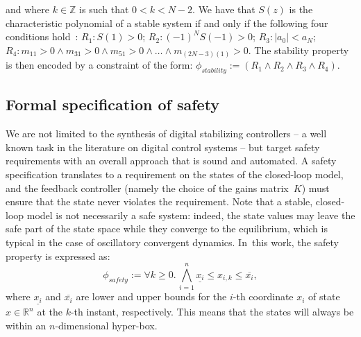 \documentclass[twocolumn]{autart}    %
\newcommand{\addtodo}[1]{\textcolor{red}{[#1]}}
\begin{document}
%
and where $k \in \mathbb{Z}$ is such that $0 < k < N - 2$. 
We have that $S(z)$ is the characteristic polynomial of a stable system if and only if the following four conditions hold~\cite{astrom1997computer}:
$R_1: S(1) > 0$;
$R_2: (−1)^N S(−1) > 0$;
$R_3: |a_0| < a_N$;
$R_4: m_{11} > 0 \wedge\allowbreak
      m_{31}>0 \wedge\allowbreak
      m_{51}>0 \wedge \ldots \wedge\allowbreak
      m_{(2N{-}3)(1)}>0$.
%
The stability property is then encoded by a constraint of the form:
$
\phi_\mathit{stability} := (R_1 \wedge R_2 \wedge R_3 \wedge R_4).
$


\subsection{Formal specification of safety} 
\label{ssec:safespecification}

We are not limited to the synthesis of digital stabilizing controllers -- a
well known task in the literature on digital control systems -- but target
safety requirements with an overall approach that is sound and automated. 
A safety specification translates to a requirement on the states of the closed-loop model, 
and the feedback controller (namely the choice of the gains matrix~$K$) 
must ensure that the state never violates the requirement.  
Note that a stable, closed-loop model is not necessarily a safe system: 
indeed, the state values may leave the safe part of the state space while they converge
to the equilibrium, which is typical in the case of oscillatory convergent dynamics. 
In~this work, the safety property is expressed as:
%
\begin{equation}
\label{eq:safetyliteral}
\phi_\mathit{safety} := \forall k\ge 0.\, \bigwedge_{i=1}^{n}{\underline{x_{i}} \leq x_{i,k} \leq \overline{x_{i}}},
\end{equation}
%
%
where $\underline{x_{i}}$ and $\overline{x_{i}}$ are lower and upper bounds
for the $i$-th coordinate $x_{i}$ of state $x\in \mathbb R^n$ at the $k$-th
instant, respectively.  This means that the states will always be within an $n$-dimensional hyper-box.
\end{document}

